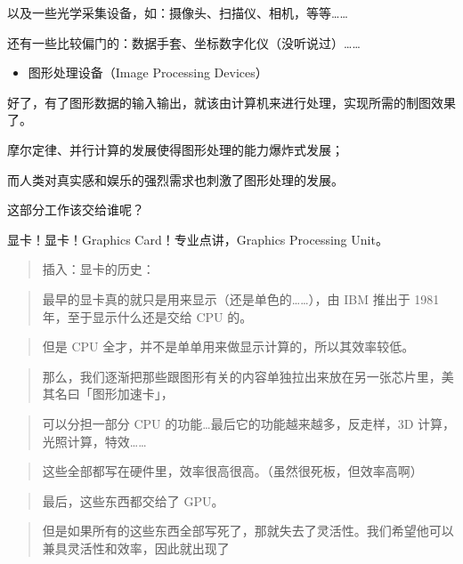 \documentclass[
]{article}
\begin{document}
以及一些光学采集设备，如：摄像头、扫描仪、相机，等等\ldots\ldots{}

还有一些比较偏门的：数据手套、坐标数字化仪（没听说过）\ldots\ldots{}

\begin{itemize}
\item
  图形处理设备（Image Processing Devices）
\end{itemize}

好了，有了图形数据的输入输出，就该由计算机来进行处理，实现所需的制图效果了。

摩尔定律、并行计算的发展使得图形处理的能力爆炸式发展；

而人类对真实感和娱乐的强烈需求也刺激了图形处理的发展。

这部分工作该交给谁呢？

显卡！显卡！Graphics Card！专业点讲，Graphics Processing Unit。

\begin{quote}
插入：显卡的历史：
\end{quote}

\begin{quote}
最早的显卡真的就只是用来显示（还是单色的\ldots\ldots），由 IBM 推出于
1981 年，至于显示什么还是交给 CPU 的。
\end{quote}

\begin{quote}
但是 CPU 全才，并不是单单用来做显示计算的，所以其效率较低。
\end{quote}

\begin{quote}
那么，我们逐渐把那些跟图形有关的内容单独拉出来放在另一张芯片里，美其名曰「图形加速卡」，
\end{quote}

\begin{quote}
可以分担一部分 CPU 的功能\ldots 最后它的功能越来越多，反走样，3D
计算，光照计算，特效\ldots\ldots{}
\end{quote}

\begin{quote}
这些全部都写在硬件里，效率很高很高。（虽然很死板，但效率高啊）
\end{quote}

\begin{quote}
最后，这些东西都交给了 GPU。
\end{quote}

\begin{quote}
但是如果所有的这些东西全部写死了，那就失去了灵活性。我们希望他可以兼具灵活性和效率，因此就出现了
\end{quote}
\end{document}
